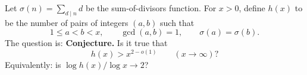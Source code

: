 Let $\sigma(n)=\sum_{d\mid n} d$ be the sum-of-divisors function. For $x>0$, define $h(x)$ to be the number of pairs of integers $(a,b)$ such that
\[
1\le a<b<x,\qquad \gcd(a,b)=1,\qquad \sigma(a)=\sigma(b).
\]
The question is:
\medskip
\noindent\textbf{Conjecture.} Is it true that
\[
 h(x) > x^{2-o(1)}\qquad (x\to\infty)?
\]
Equivalently: is $\log h(x) / \log x \to 2$?
